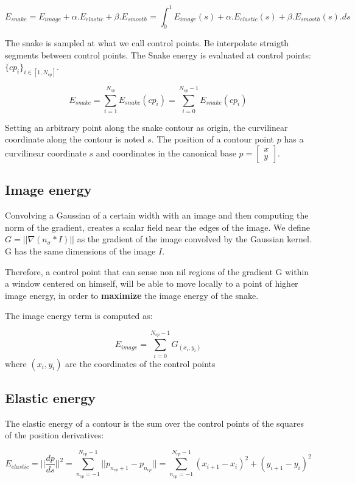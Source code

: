 \documentclass[24pt]{article}
\begin{document}
$$E_{snake} = E_{image} + \alpha.E_{elastic} + \beta.E_{smooth}= \int_0^1  E_{image}(s)  + \alpha.E_{elastic}(s) + \beta.E_{smooth}(s) .ds $$ 


The snake is sampled at what we call control points. Be interpolate straigth segments between control points. The Snake energy is evaluated at control points: $\{cp_i\}_{i \in [1, N_{cp}]}$. 


$$E_{snake} = \sum_{i= 1}^{N_{cp}} E_{snake}(cp_i) = \sum_{i= 0}^{N_{cp}-1} E_{snake}(cp_i) $$


Setting an arbitrary point along the snake contour as origin, the curvilinear coordinate along the contour is noted $s$. The position of a contour point $p$ has a curvilinear coordinate $s$ and coordinates in the canonical base $p = \begin{bmatrix}
  x \\
  y
\end{bmatrix}$. 




\subsection{Image energy}

	Convolving a Gaussian of a certain width with an image and then 
computing the norm of the gradient, creates a scalar field near the edges of the image.  We define $ G = || \nabla (n_{\sigma} * I) || $ as the gradient of the image convolved by the Gaussian kernel. G has the same dimensions of the image $I$. 

Therefore, a control point that can sense non nil regions of the gradient G within a window centered on himself, will be able to move locally to a point of higher image energy, in order to \textbf{maximize}  the image energy of the snake. 



The image energy term is computed as:

$$E_{image} = \sum_{i = 0}^{N_{cp}-1} G_{(x_i, y_i)} $$ where $(x_i,y_i)$ are the coordinates of the control points  
 
\subsection{Elastic energy} 
   The elastic energy of a contour is the sum over the control points of the squares of the position derivatives:
   
   $$E_{elastic} = || \frac{dp}{ds}||^2 = \sum_{n_{cp} = -1}^{N_{cp}-1} ||p_{n_{cp}+1} -  p_{n_{cp}} ||  = \sum_{n_{cp} = -1}^{N_{cp}-1} (x_{i+1} - x_{i})^2 + (y_{i+1} - y_{i})^2   $$   
\end{document}
